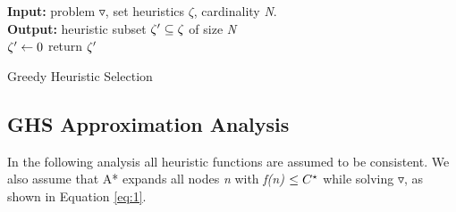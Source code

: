 \documentclass[11pt,a4paper,oneside]{report}
\begin{document}
\begin{algorithm}[H]
\textbf{Input:} problem $\triangledown$, set heuristics $\zeta
$, cardinality \textit{N}.\\
\textbf{Output:} heuristic subset $\zeta\sp{\prime} \subseteq \zeta$ of size \textit{N}\\
\SetAlgoLined
 $\zeta\sp{\prime} \leftarrow 0$\;
 return $\zeta\sp{\prime}$
 \caption{Greedy Heuristic Selection}
\end{algorithm}

\subsection{GHS Approximation Analysis}
In the following analysis all heuristic functions are assumed to be consistent. We also assume that A* expands all nodes \textit{n} with \textit{f(n) $\leq C\sp{\star}$} while solving $\triangledown$, as shown in Equation \ref{eq:1}.






%
\end{document}

